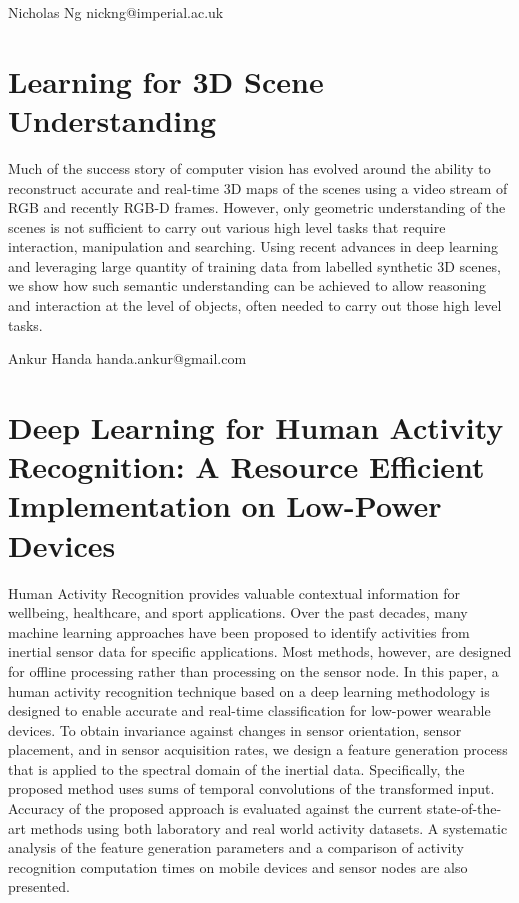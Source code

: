 \documentclass{article}
\begin{document}
Nicholas Ng
nickng@imperial.ac.uk
\section*{Learning for 3D Scene Understanding}

Much of the success story of computer vision has evolved around the ability to
reconstruct accurate and real-time 3D maps of the scenes using a video stream of
RGB and recently RGB-D frames. However, only geometric understanding of the
scenes is not sufficient to carry out various high level tasks that require
interaction, manipulation and searching. Using recent advances in deep learning
and leveraging large quantity of training data from labelled synthetic 3D
scenes, we show how such semantic understanding can be achieved to allow
reasoning and interaction at the level of objects, often needed to carry out
those high level tasks.

Ankur Handa
handa.ankur@gmail.com
\section*{Deep Learning for Human Activity Recognition: A Resource Efficient
Implementation on Low-Power Devices}

Human Activity Recognition provides valuable contextual information for
wellbeing, healthcare, and sport applications. Over the past decades, many
machine learning approaches have been proposed to identify activities from
inertial sensor data for specific applications. Most methods, however, are
designed for offline processing rather than processing on the sensor node. In
this paper, a human activity recognition technique based on a deep learning
methodology is designed to enable accurate and real-time classification for
low-power wearable devices. To obtain invariance against changes in sensor
orientation, sensor placement, and in sensor acquisition rates, we design a
feature generation process that is applied to the spectral domain of the
inertial data. Specifically, the proposed method uses sums of temporal
convolutions of the transformed input. Accuracy of the proposed approach is
evaluated against the current state-of-the-art methods using both laboratory and
real world activity datasets. A systematic analysis of the feature generation
parameters and a comparison of activity recognition computation times on mobile
devices and sensor nodes are also presented.
\end{document}
